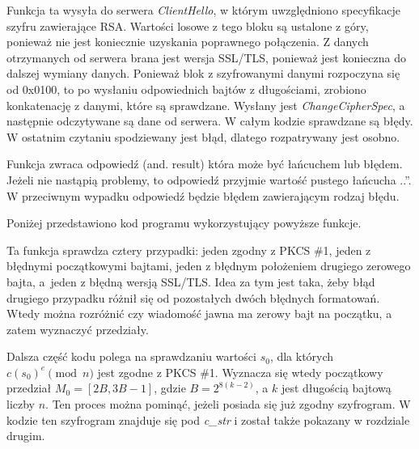 \documentclass[12pt,twoside,a4]{mwbk}
\theoremstyle{definition}
\begin{document}
Funkcja ta wysyła do serwera \textit{ClientHello}, w którym uwzględniono specyfikacje szyfru zawierające RSA. Wartości losowe z tego bloku są ustalone z góry, ponieważ nie jest koniecznie uzyskania poprawnego połączenia. Z danych otrzymanych od serwera brana jest wersja SSL/TLS, ponieważ jest konieczna do dalszej wymiany danych. Ponieważ blok z szyfrowanymi danymi rozpoczyna się od 0x0100, to po wysłaniu odpowiednich bajtów z długościami, zrobiono konkatenację z danymi, które są sprawdzane. Wysłany jest \textit{ChangeCipherSpec}, a następnie odczytywane są dane od serwera. W całym kodzie sprawdzane są błędy. W ostatnim czytaniu spodziewany jest błąd, dlatego rozpatrywany jest osobno. \\ \par
Funkcja zwraca odpowiedź (and. result) która może być łańcuchem lub błędem. Jeżeli nie nastąpią problemy, to odpowiedź przyjmie wartość pustego łańcucha ..''. W przeciwnym wypadku odpowiedź będzie błędem zawierającym rodzaj błędu. \\ \par

Poniżej przedstawiono kod programu wykorzystujący powyższe funkcje.



Ta funkcja sprawdza cztery przypadki: jeden zgodny z PKCS \#1, jeden z błędnymi początkowymi bajtami, jeden z błędnym położeniem drugiego zerowego bajta, a~jeden z błędną wersją SSL/TLS. Idea za tym jest taka, żeby błąd drugiego przypadku różnił się od pozostałych dwóch błędnych formatowań. Wtedy można rozróżnić czy wiadomość jawna ma zerowy bajt na początku, a zatem wyznaczyć przedziały. \\ \par

Dalsza część kodu \cite{advances} polega na sprawdzaniu wartości $s_0$, dla których $c (s_0)^e \pmod{n}$ jest zgodne z PKCS \#1. Wyznacza się wtedy początkowy przedział $M_0 = [2B, 3B -1]$, gdzie $B = 2^{8(k-2)}$, a $k$ jest długością bajtową liczby $n$. Ten proces można pominąć, jeżeli posiada się już zgodny szyfrogram. W kodzie ten szyfrogram znajduje się pod \textit{c\_str} i został także pokazany w rozdziale drugim. \\ \par
\end{document}
